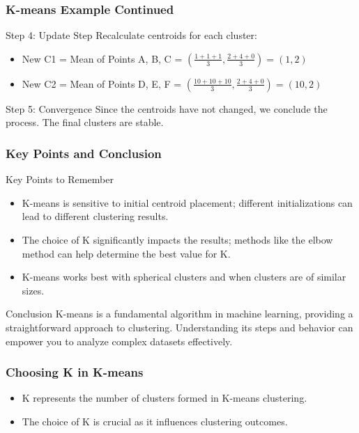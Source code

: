 \documentclass[aspectratio=169]{beamer}
\begin{document}
\begin{frame}[fragile]
    \frametitle{K-means Example Continued}
    \begin{block}{Step 4: Update Step}
        Recalculate centroids for each cluster:
        \begin{itemize}
            \item New C1 = Mean of Points A, B, C = \(\left(\frac{1+1+1}{3}, \frac{2+4+0}{3}\right) = (1, 2)\)
            \item New C2 = Mean of Points D, E, F = \(\left(\frac{10+10+10}{3}, \frac{2+4+0}{3}\right) = (10, 2)\)
        \end{itemize}
    \end{block}
    
    \begin{block}{Step 5: Convergence}
        Since the centroids have not changed, we conclude the process. The final clusters are stable.
    \end{block}
\end{frame}

\begin{frame}[fragile]
    \frametitle{Key Points and Conclusion}
    \begin{block}{Key Points to Remember}
        \begin{itemize}
            \item K-means is sensitive to initial centroid placement; different initializations can lead to different clustering results.
            \item The choice of K significantly impacts the results; methods like the elbow method can help determine the best value for K.
            \item K-means works best with spherical clusters and when clusters are of similar sizes.
        \end{itemize}
    \end{block}
    
    \begin{block}{Conclusion}
        K-means is a fundamental algorithm in machine learning, providing a straightforward approach to clustering. Understanding its steps and behavior can empower you to analyze complex datasets effectively.
    \end{block}
\end{frame}

\begin{frame}[fragile]
    \frametitle{Choosing K in K-means}
    \begin{itemize}
        \item K represents the number of clusters formed in K-means clustering.
        \item The choice of K is crucial as it influences clustering outcomes.
    \end{itemize}
\end{frame}
\end{document}

